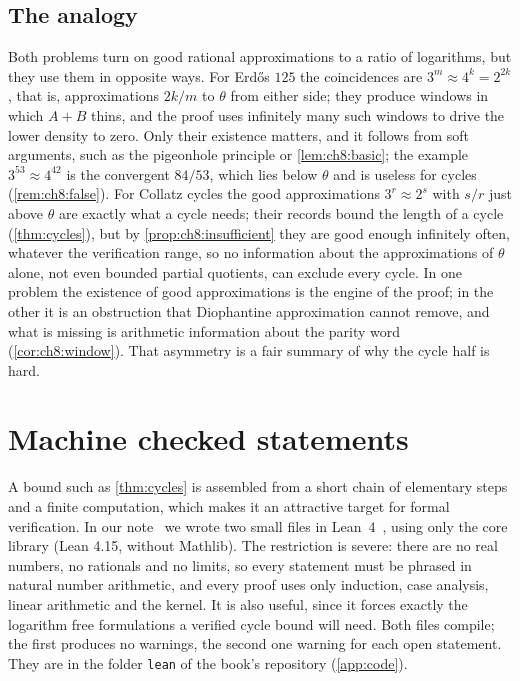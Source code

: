 \subsection{The analogy}

Both problems turn on good rational approximations to a ratio of logarithms, but they use them in opposite ways.
For Erd\H{o}s $125$ the coincidences are $3^m\approx4^k=2^{2k}$, that is, approximations $2k/m$ to $\theta$ from either side; they produce windows in which $A+B$ thins, and the proof uses infinitely many such windows to drive the lower density to zero.
Only their existence matters, and it follows from soft arguments, such as the pigeonhole principle or \cref{lem:ch8:basic}; the example $3^{53}\approx4^{42}$ is the convergent $84/53$, which lies below $\theta$ and is useless for cycles (\cref{rem:ch8:false}).
For Collatz cycles the good approximations $3^r\approx2^s$ with $s/r$ just above $\theta$ are exactly what a cycle needs; their records bound the length of a cycle (\cref{thm:cycles}), but by \cref{prop:ch8:insufficient} they are good enough infinitely often, whatever the verification range, so no information about the approximations of $\theta$ alone, not even bounded partial quotients, can exclude every cycle.
In one problem the existence of good approximations is the engine of the proof; in the other it is an obstruction that Diophantine approximation cannot remove, and what is missing is arithmetic information about the parity word (\cref{cor:ch8:window}).
That asymmetry is a fair summary of why the cycle half is hard.

\section{Machine checked statements}\label{sec:ch8:lean}

A bound such as \cref{thm:cycles} is assembled from a short chain of
elementary steps and a finite computation, which makes it an attractive
target for formal verification. In our note~\cite{polsonsokolov2026nexus} we
wrote two small files in Lean~4~\cite{moura2021}, using only the core library
(Lean 4.15, without Mathlib). The restriction is severe: there are no real
numbers, no rationals and no limits, so every statement must be phrased in
natural number arithmetic, and every proof uses only induction, case
analysis, linear arithmetic and the kernel. It is also useful, since it
forces exactly the logarithm free formulations a verified cycle bound will
need. Both files compile; the first produces no warnings, the second one
warning for each open statement. They are in the folder \texttt{lean} of the book's repository (\cref{app:code}).

